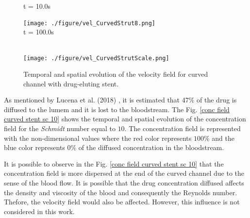 \documentclass[10pt,fleqn,a4paper,twoside]{article}
\begin{document}
\begin{figure}[H]
\begin{minipage}{.50\linewidth}
      t = 10.0s
     \end{minipage}%
     \begin{minipage}{.50\linewidth}
     \medskip
      \centering
      \texttt{[image: ./figure/vel\_CurvedStrut8.png]}\\
      t = 100.0s
     \end{minipage}\\[10pt]
      \centering
      \texttt{[image: ./figure/vel\_CurvedStrutScale.png]}\\
     \medskip
     \label{velocity field curved stent}
     \caption{
Temporal and spatial evolution of the velocity field for curved channel with
drug-eluting stent.}
\end{figure}


\smallskip
As mentioned by Lucena et al. (2018) \cite{lucena2018}, 
it is estimated that 47\% of the drug is diffused to the 
lumem and it is lost to the bloodstream.
The Fig. \ref{conc field curved stent sc 10}  shows the temporal and spatial evolution 
of the concentration field for the \textit{Schmidt} number equal to $10$.
The concentration field is 
represented with the non-dimensional values where the red color 
represents $100$\% and the blue color represents $0$\% 
of the diffused concentration in the bloodstream. 

\medskip
It is possible to observe in the Fig. \ref{conc field curved stent sc 10}  that
the concentration field
is more dispersed at the end of the curved channel due to
the sense of the blood flow. It is possible that the
drug concentration diffused affects the density and viscosity of the blood
and consequently the Reynolds number. Thefore, the velocity field would
also be affected. However, this influence is not considered in this work.
\end{document}
